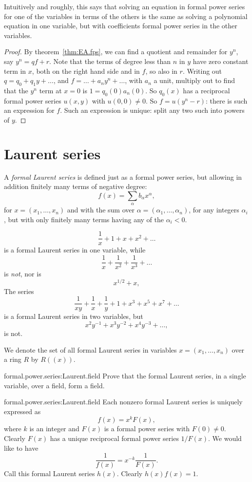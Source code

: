 Intuitively and roughly, this says that solving an equation in formal power series for one of the variables in terms of the others is the same as solving a polynomial equation in one variable, but with coefficients formal power series in the other variables.
\begin{proof}
By theorem~\vref{thm:EA.fps}, we can find a quotient and remainder for \(y^n\), say \(y^n=qf+r\).
Note that the terms of degree less than \(n\) in \(y\) have zero constant term in \(x\), both on the right hand side and in \(f\), so also in \(r\).
Writing out \(q=q_0+q_1y+\dots\), and \(f=\dots+a_n y^n+\dots\), with \(a_n\) a unit, multiply out to find that the \(y^n\) term at \(x=0\) is \(1=q_0(0)a_n(0)\).
So \(q_0(x)\) has a reciprocal formal power series \(u(x,y)\) with \(u(0,0)\ne 0\).
So \(f=u(y^n-r)\): there is such an expression for \(f\).
Such an expression is unique: split any two such into powers of \(y\).
\end{proof}
\section{Laurent series}
A \emph{formal Laurent series} is defined just as a formal power series, but allowing in addition finitely many terms of negative degree:
\[
f(x)=\sum_{\alpha} b_{\alpha}x^{\alpha},
\]
for \(x=(x_1,\dots,x_n)\) and with the sum over \(\alpha=(\alpha_1,\dots,\alpha_n)\), for any integers \(\alpha_i\), but with only finitely many terms having any of the \(\alpha_i<0\).
\begin{example}
\[
\frac{1}{x}+1+x+x^2+\dots
\]
is a formal Laurent series in one variable, while
\[
\frac{1}{x}+\frac{1}{x^2}+\frac{1}{x^3}+\dots
\]
is \emph{not}, nor is
\[
x^{1/2}+x,
\]
The series
\[
\frac{1}{xy}+\frac{1}{x}+\frac{1}{y}+1+x^3+x^5+x^7+\dots
\]
is a formal Laurent series in two variables, but
\[
x^2y^{-1}+x^3y^{-2}+x^4y^{-3}+\dots,
\]
is not.
\end{example}
We denote the set of all formal Laurent series in variables \(x=(x_1,\dots,x_n)\) over a ring \(R\) by \(R((x))\).
\begin{problem}{formal.power.series:Laurent.field}
Prove that the formal Laurent series, in a single variable, over a field, form a field.
\end{problem}
\begin{answer}{formal.power.series:Laurent.field}
Each nonzero formal Laurent series is uniquely expressed as 
\[
f(x)=x^k F(x),
\]
where \(k\) is an integer and \(F(x)\) is a formal power series with \(F(0)\ne 0\).
Clearly \(F(x)\) has a unique reciprocal formal power series \(1/F(x)\).
We would like to have
\[
\frac{1}{f(x)}=x^{-k}\frac{1}{F(x)}.
\]
Call this formal Laurent series \(h(x)\).
Clearly \(h(x)f(x)=1\).
\end{answer}
